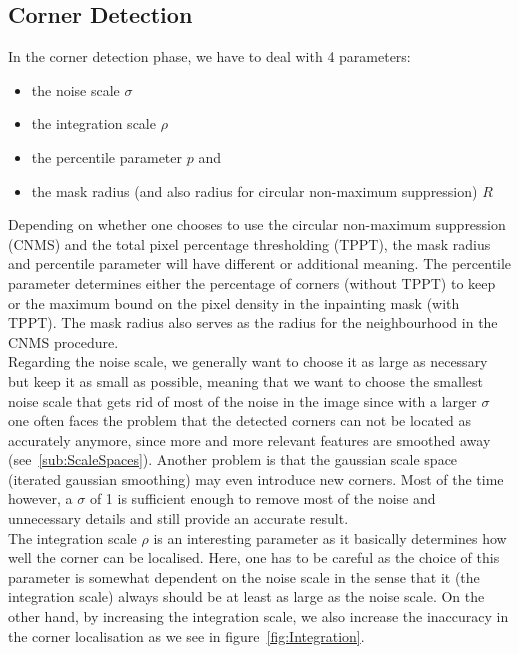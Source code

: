 \subsection{Corner Detection}\label{sec:CornerEx}
In the corner detection phase, we have to deal with 4 parameters:
\begin{itemize}
    \item the noise scale $\sigma$
    \item the integration scale $\rho$
    \item the percentile parameter $p$ and
    \item the mask radius (and also radius for circular non-maximum suppression) $R$
\end{itemize}
Depending on whether one chooses to use the circular non-maximum suppression (CNMS) and the total pixel
percentage thresholding (TPPT), the mask radius and percentile parameter will have different or additional
meaning.
The percentile parameter determines either the percentage of corners (without TPPT) to keep or the maximum bound
on the pixel density in the inpainting mask (with TPPT).
The mask radius also serves as the radius for the neighbourhood in the CNMS procedure.\\
Regarding the noise scale, we generally want to choose it as large as necessary but keep it as small as
possible, meaning that we want to choose the smallest noise scale that gets rid of most of the
noise in the image since with a larger $\sigma$ 
one often faces the problem that the detected corners can not be located as accurately anymore,
since more and more relevant features are smoothed away (see~\ref{sub:ScaleSpaces}). Another problem
is that the gaussian scale space (iterated gaussian smoothing) may even introduce new
corners.\cite{weickert96}
 Most of the time however, a $\sigma$ of 1 is sufficient enough to remove most of the noise and unnecessary
 details and still provide an accurate result.\\
 The integration scale $\rho$ is an interesting parameter as it basically determines how well the
 corner can be localised. Here, one has to be careful as the choice of this parameter is somewhat
 dependent on the noise scale in the sense that it (the integration scale) always should be 
 at least as large as the noise scale. On the other hand, by increasing the integration scale, we
 also increase the inaccuracy in the corner localisation as we see in figure~\ref{fig:Integration}.
